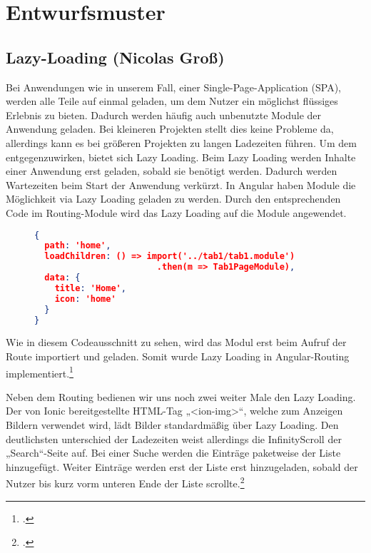 
\section{Entwurfsmuster}

\subsection*{Lazy-Loading (Nicolas Groß)}

Bei Anwendungen wie in unserem Fall, einer Single-Page-Application (SPA), werden alle Teile auf einmal geladen, um dem Nutzer ein möglichst flüssiges Erlebnis zu bieten. Dadurch werden häufig auch unbenutzte Module der Anwendung geladen. Bei kleineren Projekten stellt dies keine Probleme da, allerdings kann es bei größeren Projekten zu langen Ladezeiten führen. Um dem entgegenzuwirken, bietet sich Lazy Loading. Beim Lazy Loading werden Inhalte einer Anwendung erst geladen, sobald sie benötigt werden. Dadurch werden Wartezeiten beim Start der Anwendung verkürzt.
In Angular haben Module die Möglichkeit via Lazy Loading geladen zu werden. Durch den entsprechenden Code im Routing-Module wird das Lazy Loading auf die Module angewendet.

\begin{figure}[bht]
\begin{lstlisting}[caption=Codeausschnitt des Tabs Routingmodule,language=json]
{
  path: 'home',
  loadChildren: () => import('../tab1/tab1.module')
                        .then(m => Tab1PageModule),
  data: {
    title: 'Home', 
    icon: 'home'
  }
}
\end{lstlisting}
\end{figure}

Wie in diesem Codeausschnitt zu sehen, wird das Modul erst beim Aufruf der Route importiert und geladen. Somit wurde Lazy Loading in Angular-Routing implementiert.\footcites[.vgl]{LazyLoading2021}

Neben dem Routing bedienen wir uns noch zwei weiter Male den Lazy Loading. Der von Ionic bereitgestellte HTML-Tag „<ion-img>“, welche zum Anzeigen Bildern verwendet wird, lädt Bilder standardmäßig über Lazy Loading. Den deutlichsten unterschied der Ladezeiten weist allerdings die InfinityScroll der „Search“-Seite auf. Bei einer Suche werden die Einträge paketweise der Liste hinzugefügt. Weiter Einträge werden erst der Liste erst hinzugeladen, sobald der Nutzer bis kurz vorm unteren Ende der Liste scrollte.\footcites[.vgl]{Ionic2013b}

